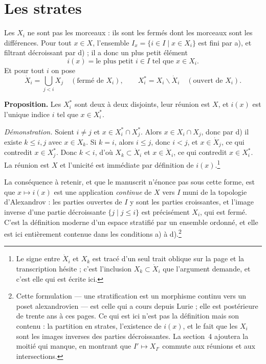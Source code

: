 \documentclass[11pt,a4paper]{article}
\begin{document}
\section*{Les strates}

Les $X_{i}$ ne sont pas les morceaux : ils sont les fermés dont les morceaux sont
les différences. Pour tout $x \in X$, l'ensemble $I_{x} = \{ i \in I \mid x \in
X_{i}\}$ est fini par a), et filtrant décroissant par d) ; il a donc un plus
petit élément
\[
  i(x) = \text{le plus petit } i \in I \text{ tel que } x \in X_{i}.
\]
Et pour tout $i$ on pose
\[
  \dot{X}_{i} = \bigcup_{j < i} X_{j} \quad (\text{fermé de } X_{i}),
  \qquad
  X_{i}^{*} = X_{i} \smallsetminus \dot{X}_{i} \quad (\text{ouvert de } X_{i}).
\]

\textbf{Proposition.} Les $X_{i}^{*}$ sont deux à deux disjoints, leur réunion
est $X$, et $i(x)$ est l'unique indice $i$ tel que $x \in X_{i}^{*}$.

\emph{Démonstration.} Soient $i \neq j$ et $x \in X_{i}^{*} \cap X_{j}^{*}$.
Alors $x \in X_{i} \cap X_{j}$, donc par d) il existe $k \leq i,j$ avec
$x \in X_{k}$. Si $k = i$, alors $i \leq j$, donc $i < j$, et $x \in \dot{X}_{j}$,
ce qui contredit $x \in X_{j}^{*}$. Donc $k < i$, d'où $X_{k} \subset \dot{X}_{i}$
et $x \in \dot{X}_{i}$, ce qui contredit $x \in X_{i}^{*}$. La réunion est $X$ et
l'unicité est immédiate par définition de $i(x)$.\footnote{Le signe entre
$\dot{X}_{i}$ et $X_{k}$ est tracé d'un seul trait oblique sur la page et la
transcription hésite ; c'est l'inclusion $X_{k} \subset \dot{X}_{i}$ que
l'argument demande, et c'est elle qui est écrite ici.}

La conséquence à retenir, et que le manuscrit n'énonce pas sous cette forme,
est que $x \mapsto i(x)$ est une application \emph{continue} de $X$ vers $I$
muni de la topologie d'Alexandrov : les parties ouvertes de $I$ y sont les
parties croissantes, et l'image inverse d'une partie décroissante
$\{ j \mid j \leq i \}$ est précisément $X_{i}$, qui est fermé. C'est la
définition moderne d'un espace stratifié par un ensemble ordonné, et elle est ici
entièrement contenue dans les conditions a) à d).\footnote{Cette formulation —
une stratification est un morphisme continu vers un poset alexandrovien — est
celle qui a cours depuis Lurie ; elle est postérieure de trente ans à ces pages.
Ce qui est ici n'est pas la définition mais son contenu : la partition en
strates, l'existence de $i(x)$, et le fait que les $X_{i}$ sont les images
inverses des parties décroissantes. La section~4 ajoutera la moitié qui manque,
en montrant que $I' \mapsto X_{I'}$ commute aux réunions et aux intersections.}
\end{document}

